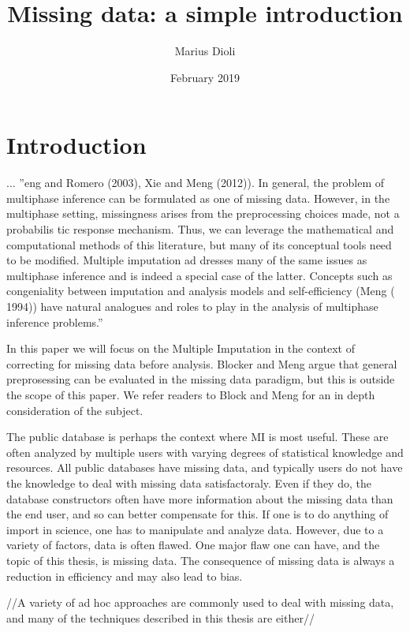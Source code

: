 \documentclass{article}
\title{Missing data: a simple introduction}
\author{Marius Dioli}
\date{February 2019}
\begin{document}
	
	\maketitle
	
	
	\section{Introduction}
	... ''eng and Romero (2003), Xie and Meng (2012)). In general,
	the problem of multiphase inference can be formulated as one of missing data. However, in the
	multiphase setting, missingness arises from the preprocessing choices made, not a probabilis
	tic response mechanism. Thus, we can leverage the mathematical and computational methods
	of this literature, but many of its conceptual tools need to be modified. Multiple imputation ad
	dresses many of the same issues as multiphase inference and is indeed a special case of the
	latter. Concepts such as congeniality between imputation and analysis models and self-efficiency
	(Meng ( 1994)) have natural analogues and roles to play in the analysis of multiphase inference
	problems.''
	
	In this paper we will focus on the Multiple Imputation in the context of correcting for missing data before analysis. Blocker and Meng argue that general preprosessing can be evaluated in the missing data paradigm, but this is outside the scope of this paper. We refer readers to Block and Meng for an in depth consideration of the subject.
	
	The public database is perhaps the context where MI is most useful. These are often analyzed by multiple users with varying degrees of statistical knowledge and resources. All public databases have missing data, and typically users do not have the knowledge to deal with missing data satisfactoraly. Even if they do, the database constructors often have more information about the missing data than the end user, and so can better compensate for this.
	If one is to do anything of import in science, one has to manipulate and analyze data. However, due to a variety of factors, data is often flawed. One major flaw one can have, and the topic of this thesis, is missing data. The consequence of missing data is always a reduction in efficiency and may also lead to bias.
	
	//A variety of ad hoc approaches are commonly used to deal with missing data, and many of the techniques described in this thesis are either//
	
\end{document}
